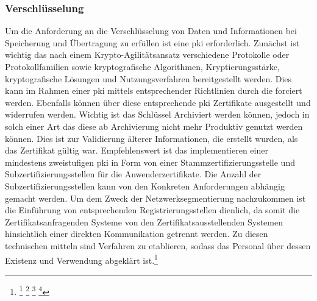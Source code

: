 \documentclass[11pt,a4paper,hidelinks]{article}   %
\begin{document}
            \subsubsection{Verschlüsselung}
            Um die Anforderung an die Verschlüsselung von Daten und Informationen bei Speicherung und Übertragung zu erfüllen ist eine \gls{pki} erforderlich. Zunächst ist wichtig das nach einem Krypto-Agilitätsansatz verschiedene Protokolle oder Protokollfamilien sowie kryptografische Algorithmen, Kryptierungsstärke, kryptografische Lösungen und Nutzungsverfahren bereitgestellt werden. Dies kann im Rahmen einer \gls{pki} mittels entsprechender Richtlinien durch die  forciert werden. Ebenfalls können über diese entsprechende \gls{pki} Zertifikate ausgestellt und widerrufen werden. Wichtig ist das Schlüssel Archiviert werden können, jedoch in solch einer Art das diese ab Archivierung nicht mehr Produktiv genutzt werden können. Dies ist zur Validierung älterer Informationen, die erstellt wurden, als das Zertifikat gültig war. Empfehlenswert ist das implementieren einer mindestens zweistufigen \gls{pki} in Form von einer Stammzertifizierungsstelle und Subzertifizierungsstellen für die Anwenderzertifikate. Die Anzahl der Subzertifizierungsstellen kann von den Konkreten Anforderungen abhängig gemacht werden. Um dem Zweck der Netzwerksegmentierung nachzukommen ist die Einführung von entsprechenden Registrierungsstellen dienlich, da somit die Zertifikatsanfragenden Systeme von den Zertifikatsausstellenden Systemen hinsichtlich einer direkten Kommunikation getrennt werden. Zu diesen technischen mitteln sind Verfahren zu etablieren, sodass das Personal über dessen Existenz und Verwendung abgeklärt ist.\footnote{
                \footcite[Vgl. S. 216 - 218][]{9781498707480}
                \footcite[Vgl. S. 63 - 70][]{9781907117046}
                \footcite[Vgl. S. 23 - 28, 47 - 50][]{9780815396413}
                \footcite[Vgl. S. 293, 302][]{9780763791285}
            }
\end{document}

